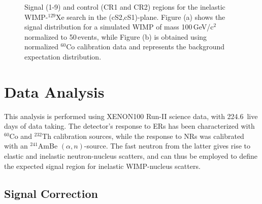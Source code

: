 \begin{figure}[t!]
	\caption{Signal (1-9) and control (CR1 and CR2) regions for the inelastic WIMP-$^{129}$Xe search in the (cS2,cS1)-plane.
		Figure (a) shows the signal distribution for a simulated WIMP of mass 100\,GeV/c$^2$ normalized to 50\,events, while Figure (b) is obtained using  
		normalized $^{60}$Co calibration data and represents the background expectation distribution.}
  \label{fig:SR}
\end{figure}

\section{Data Analysis}
\label{sec:analysis}

This analysis is performed using XENON100 Run-II science data, with 224.6~live days of data taking. The detector's response to ERs has been characterized with $^{60}$Co and $^{232}$Th calibration sources, while the response to NRs was calibrated with an $^{241}$AmBe $(\alpha,n)$-source. The fast neutron from the latter gives rise to elastic and inelastic neutron-nucleus scatters, and can thus be employed to define the expected signal region for inelastic WIMP-nucleus scatters.



\subsection{Signal Correction} 

